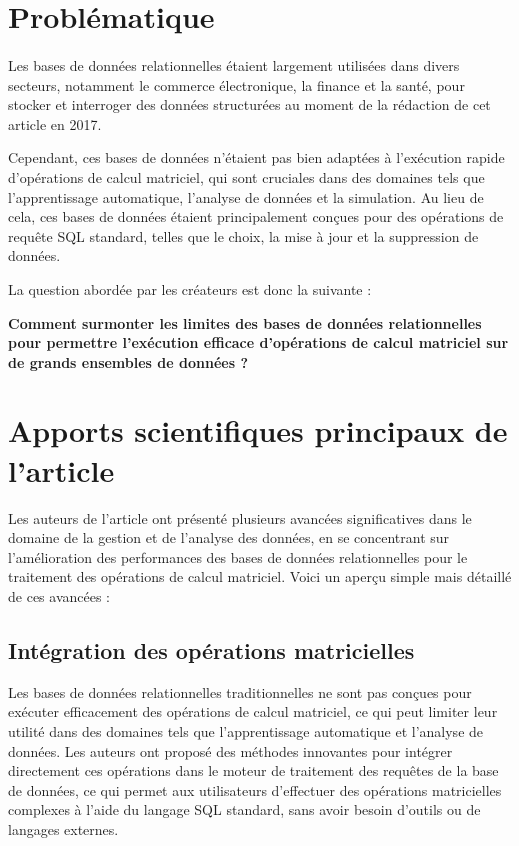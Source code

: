 \documentclass[a4paper, 12pt]{article}
\begin{document}
\clearpage 
\section{Problématique}

\paragraph{}
Les bases de données relationnelles étaient largement utilisées dans divers secteurs, notamment le commerce électronique, la finance et la santé, pour stocker et interroger des données structurées au moment de la rédaction de cet article en 2017.

Cependant, ces bases de données n'étaient pas bien adaptées à l'exécution rapide d'opérations de calcul matriciel, qui sont cruciales dans des domaines tels que l'apprentissage automatique, l'analyse de données et la simulation. Au lieu de cela, ces bases de données étaient principalement conçues pour des opérations de requête SQL standard, telles que le choix, la mise à jour et la suppression de données.

La question abordée par les créateurs est donc la suivante : 

\begin{center}
	\textbf{
		Comment surmonter les limites des bases de données relationnelles pour permettre l'exécution efficace d'opérations de calcul matriciel sur de grands ensembles de données ?
	}
\end{center}

\clearpage 
\section{Apports scientifiques principaux de l’article}

Les auteurs de l'article ont présenté plusieurs avancées significatives dans le domaine de la gestion et de l'analyse des données, en se concentrant sur l'amélioration des performances des bases de données relationnelles pour le traitement des opérations de calcul matriciel. Voici un aperçu simple mais détaillé de ces avancées :

\subsection{Intégration des opérations matricielles}
Les bases de données relationnelles traditionnelles ne sont pas conçues pour exécuter efficacement des opérations de calcul matriciel, ce qui peut limiter leur utilité dans des domaines tels que l'apprentissage automatique et l'analyse de données. Les auteurs ont proposé des méthodes innovantes pour intégrer directement ces opérations dans le moteur de traitement des requêtes de la base de données, ce qui permet aux utilisateurs d'effectuer des opérations matricielles complexes à l'aide du langage SQL standard, sans avoir besoin d'outils ou de langages externes.
\end{document}

